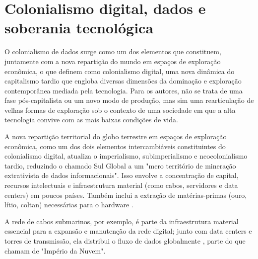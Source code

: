 \section{Colonialismo digital, dados e soberania tecnológica}
\label{sec:colonialismo-digital-dados-soberania}

O colonialismo de dados surge como um dos elementos que constituem, juntamente com a nova repartição do mundo em espaços de exploração econômica, o que  definem como colonialismo digital, uma nova dinâmica do capitalismo tardio que engloba diversas dimensões da dominação e exploração contemporânea mediada pela tecnologia. Para os autores, não se trata de uma fase pós-capitalista ou um novo modo de produção, mas sim uma rearticulação de velhas formas de exploração sob o contexto de uma sociedade em que a alta tecnologia convive com as mais baixas condições de vida.

A nova repartição territorial do globo terrestre em espaços de exploração econômica, como um dos dois elementos intercambiáveis constituintes do colonialismo digital, atualiza o imperialismo, subimperialismo e neocolonialismo tardio, reduzindo o chamado Sul Global a um "mero território de mineração extrativista de dados informacionais". Isso envolve a concentração de capital, recursos intelectuais e infraestrutura material (como cabos, servidores e data centers) em poucos países. Também inclui a extração de matérias-primas (ouro, lítio, coltan) necessárias para o hardware \cite{Faustino2023}.

A rede de cabos submarinos, por exemplo, é parte da infraestrutura material essencial para a expansão e manutenção da rede digital; junto com data centers e torres de transmissão, ela distribui o fluxo de dados globalmente \cite{Figueiredo2023}, parte do que  chamam de "Império da Nuvem". 


